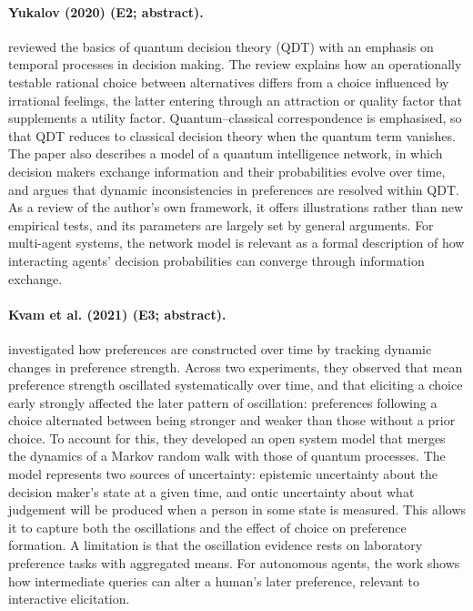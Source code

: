 \documentclass[10pt,a4paper]{article}
\begin{document}
\paragraph{Yukalov (2020) (E2; abstract).} \citet{Yukalov2020} reviewed the basics of quantum decision theory (QDT) with an emphasis on temporal processes in decision making. The review explains how an operationally testable rational choice between alternatives differs from a choice influenced by irrational feelings, the latter entering through an attraction or quality factor that supplements a utility factor. Quantum--classical correspondence is emphasised, so that QDT reduces to classical decision theory when the quantum term vanishes. The paper also describes a model of a quantum intelligence network, in which decision makers exchange information and their probabilities evolve over time, and argues that dynamic inconsistencies in preferences are resolved within QDT. As a review of the author's own framework, it offers illustrations rather than new empirical tests, and its parameters are largely set by general arguments. For multi-agent systems, the network model is relevant as a formal description of how interacting agents' decision probabilities can converge through information exchange.

\paragraph{Kvam et al. (2021) (E3; abstract).} \citet{Kvam2021} investigated how preferences are constructed over time by tracking dynamic changes in preference strength. Across two experiments, they observed that mean preference strength oscillated systematically over time, and that eliciting a choice early strongly affected the later pattern of oscillation: preferences following a choice alternated between being stronger and weaker than those without a prior choice. To account for this, they developed an open system model that merges the dynamics of a Markov random walk with those of quantum processes. The model represents two sources of uncertainty: epistemic uncertainty about the decision maker's state at a given time, and ontic uncertainty about what judgement will be produced when a person in some state is measured. This allows it to capture both the oscillations and the effect of choice on preference formation. A limitation is that the oscillation evidence rests on laboratory preference tasks with aggregated means. For autonomous agents, the work shows how intermediate queries can alter a human's later preference, relevant to interactive elicitation.
\end{document}
